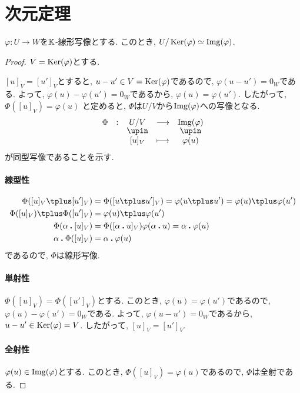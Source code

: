 \section{次元定理}
\begin{theorem}
  \label{thm:fund:hom}
  $\varphi\colon U \to W$を$\mathbb{K}$-線形写像とする.
  このとき,
  $U/\operatorname{Ker}(\varphi)\simeq \operatorname{Img}(\varphi)$.
\end{theorem}
\begin{proof}
  $V=\operatorname{Ker}(\varphi)$とする.
  
  $[u]_V=[u']_V$とすると, $u-u'\in V=\operatorname{Ker}(\varphi)$であるので,
  $\varphi(u-u')=0_W$である.
  よって, $\varphi(u)-\varphi(u')=0_W$であるから,
  $\varphi(u)=\varphi(u')$.
  したがって, $\Phi([u]_V)=\varphi(u)$
  と定めると,
  $\Phi$は$U/V$から$\operatorname{Img}(\varphi)$への写像となる.
  \begin{align*}
    \shazo{\Phi}{U/V}{\Img(\varphi)}
    {[u]_V}{\varphi(u)}
  \end{align*}
  が同型写像であることを示す.
  \paragraph{線型性}
  \begin{align*}
    \Phi([u]_V\plus [u']_V)&=\Phi([u\plus u']_V)=\varphi(u\plus u')=\varphi(u)\plus \varphi(u')\\
    \Phi([u]_V)\plus \Phi([u']_V)&=\varphi(u)\plus \varphi(u')\\
    \Phi(\alpha\act [u]_V)&=\Phi([\alpha\act u]_V)\varphi(\alpha\act u)=\alpha\act \varphi(u)\\
    \alpha\act \Phi([u]_V)&=\alpha\act \varphi(u)
  \end{align*}
  であるので, $\Phi$は線形写像.
  \paragraph{単射性}
  $\Phi([u]_V)=\Phi([u']_V)$とする.
  このとき, $\varphi(u)=\varphi(u')$であるので,
  $\varphi(u)-\varphi(u')=0_W$である.
  よって,
  $\varphi(u-u')=0_W$であるから,
  $u-u'\in \operatorname{Ker}(\varphi)=V$.
  したがって, $[u]_V=[u']_V$.
  
  \paragraph{全射性}
  $\varphi(u)\in \operatorname{Img}(\varphi)$とする.
  このとき, $\Phi([u]_V)=\varphi(u)$であるので,
  $\Phi$は全射である.
\end{proof}


